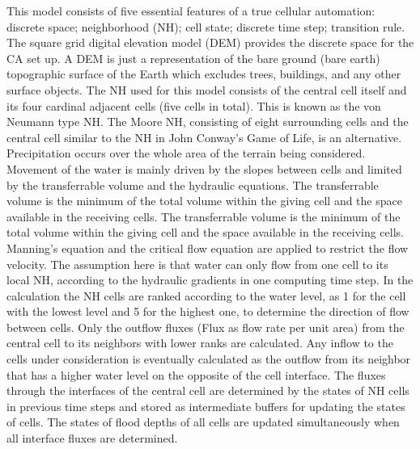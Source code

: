 This model consists of five essential features of a true cellular automation: discrete space; neighborhood (NH); cell state; discrete time step; transition rule.
The square grid digital elevation model (DEM) provides the discrete space for the CA set up. A DEM is just a representation of the bare ground (bare earth) topographic surface of the Earth which excludes trees, buildings, and any other surface objects. The NH used for this model consists of the central cell itself and its four cardinal adjacent cells (five cells in total). This is known as the von Neumann type NH. The Moore NH, consisting of eight surrounding cells and the central cell similar to the NH in John Conway’s Game of Life, is an alternative. 
Precipitation occurs over the whole area of the terrain being considered. Movement of the water is mainly driven by the slopes between cells and limited by the transferrable volume and the hydraulic equations. The transferrable volume is the minimum of the total volume within the giving cell and the space available in the receiving cells. The transferrable volume is the minimum of the total volume within the giving cell and the space available in the receiving cells. Manning’s equation and the critical flow equation are applied to restrict the flow velocity. The assumption here is that water can only flow from one cell to its local NH, according to the hydraulic gradients in one computing time step. 
In the calculation the NH cells are ranked according to the water level, as 1 for the cell with the lowest level and 5 for the highest one, to determine the direction of flow between cells. Only the outflow fluxes (Flux as flow rate per unit area) from the central cell to its neighbors with lower ranks are calculated. Any inflow to the cells under consideration is eventually calculated as the outflow from its neighbor that has a higher water level on the opposite of the cell interface.
The fluxes through the interfaces of the central cell are determined by the states of NH cells in previous time steps and stored as intermediate buffers for updating the states of cells. The states of flood depths of all cells are updated simultaneously when all interface fluxes are determined.

